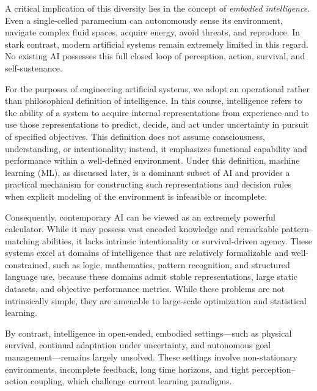 \documentclass[12pt]{article}
\begin{document}
A critical implication of this diversity lies in the concept of \textit{embodied intelligence}. Even a single-celled paramecium can autonomously sense its environment, navigate complex fluid spaces, acquire energy, avoid threats, and reproduce. In stark contrast, modern artificial systems remain extremely limited in this regard. No existing AI possesses this full closed loop of perception, action, survival, and self-sustenance.


For the purposes of engineering artificial systems, we adopt an operational rather than philosophical definition of intelligence. In this course, intelligence refers to the ability of a system to acquire internal representations from experience and to use those representations to predict, decide, and act under uncertainty in pursuit of specified objectives. This definition does not assume consciousness, understanding, or intentionality; instead, it emphasizes functional capability and performance within a well-defined environment. Under this definition, machine learning (ML), as discussed later, is a dominant subset of AI and provides a practical mechanism for constructing such representations and decision rules when explicit modeling of the environment is infeasible or incomplete.



Consequently, contemporary AI can be viewed as an extremely powerful calculator. While it may possess vast encoded knowledge and remarkable pattern-matching abilities, it lacks intrinsic intentionality or survival-driven agency. These systems excel at domains of intelligence that are relatively formalizable and well-constrained, such as logic, mathematics, pattern recognition, and structured language use, because these domains admit stable representations, large static datasets, and objective performance metrics. While these problems are not intrinsically simple, they are amenable to large-scale optimization and statistical learning.


By contrast, intelligence in open-ended, embodied settings—such as physical survival, continual adaptation under uncertainty, and autonomous goal management—remains largely unsolved. These settings involve non-stationary environments, incomplete feedback, long time horizons, and tight perception–action coupling, which challenge current learning paradigms.
\end{document}
